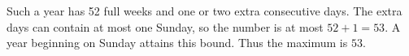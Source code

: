 Such a year has 52 full weeks and one or two extra consecutive days. The extra days can contain at most one Sunday, so the number is at most $52+1=53$. A year beginning on Sunday attains this bound. Thus the maximum is $\boxed{53}$.
